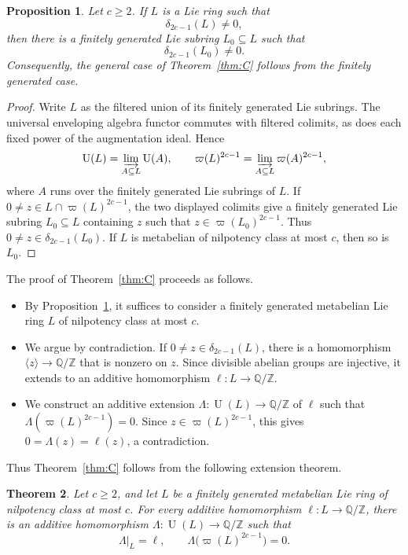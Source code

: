 \documentclass[a4paper,11pt,reqno]{amsart}
\newtheorem{theorem}{Theorem}[section]
\newtheorem{proposition}[theorem]{Proposition}
\theoremstyle{definition}
\newcommand{\Z}{\mathbb Z}
\newcommand{\Q}{\mathbb Q}
\newcommand{\D}{\Q/\Z}
\newcommand{\U}{\operatorname U}
\begin{document}
\begin{proposition}\label{prop:finitely-generated-reduction}
Let $c\geq2$.  If $L$ is a Lie ring such that
\[
                         \delta_{2c-1}(L)\neq0,
\]
then there is a finitely generated Lie subring $L_0\subseteq L$ such that
\[
                         \delta_{2c-1}(L_0)\neq0.
\]
Consequently, the general case of Theorem~\ref{thm:C} follows from the
finitely generated case.
\end{proposition}

\begin{proof}
Write $L$ as the filtered union of its finitely generated Lie subrings.
The universal enveloping algebra functor commutes with filtered colimits,
as does each fixed power of the augmentation ideal.  Hence
\[
 \U(L)=\varinjlim_{A\subseteq L}\U(A),
 \qquad
 \varpi(L)^{2c-1}
 =\varinjlim_{A\subseteq L}\varpi(A)^{2c-1},
\]
where $A$ runs over the finitely generated Lie subrings of $L$.  If
$0\neq z\in L\cap\varpi(L)^{2c-1}$, the two displayed colimits give a
finitely generated Lie subring $L_0\subseteq L$ containing $z$ such that
$z\in\varpi(L_0)^{2c-1}$.  Thus
$0\neq z\in\delta_{2c-1}(L_0)$.  If $L$ is metabelian of nilpotency class
at most $c$, then so is $L_0$.
\end{proof}

The proof of Theorem~\ref{thm:C} proceeds as follows.
\begin{itemize}[leftmargin=2em,nosep]
 \item By Proposition~\ref{prop:finitely-generated-reduction}, it suffices
 to consider a finitely generated metabelian Lie ring $L$ of nilpotency
 class at most $c$.
 \item We argue by contradiction.  If
 $0\neq z\in\delta_{2c-1}(L)$, there is a homomorphism
 $\langle z\rangle\to\D$ that is nonzero on $z$.  Since divisible abelian
 groups are injective, it extends to an additive homomorphism
 $\ell:L\to\D$.
 \item We construct an additive extension $\Lambda:\U(L)\to\D$ of $\ell$
 such that $\Lambda(\varpi(L)^{2c-1})=0$.  Since
 $z\in\varpi(L)^{2c-1}$, this gives $0=\Lambda(z)=\ell(z)$, a
 contradiction.
\end{itemize}

Thus Theorem~\ref{thm:C} follows from the following extension theorem.

\begin{theorem}\label{thm:additive-extension}
Let $c\geq2$, and let $L$ be a finitely generated metabelian Lie ring of
nilpotency class at most $c$.  For every additive homomorphism
$\ell:L\to\D$, there is an additive homomorphism $\Lambda:\U(L)\to\D$ such
that
\[
 \Lambda|_L=\ell,
 \qquad
 \Lambda\bigl(\varpi(L)^{2c-1}\bigr)=0.
\]
\end{theorem}
\end{document}
